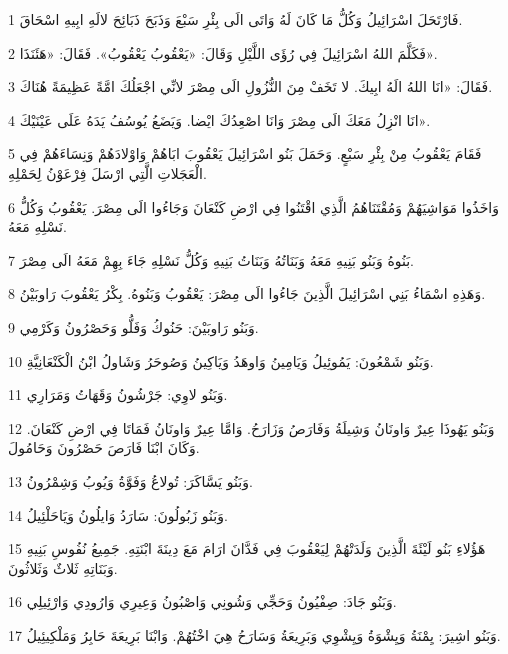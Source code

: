 \par 1 فَارْتَحَلَ اسْرَائِيلُ وَكُلُّ مَا كَانَ لَهُ وَاتَى الَى بِئْرِ سَبْعَ وَذَبَحَ ذَبَائِحَ لالَهِ ابِيهِ اسْحَاقَ.
\par 2 فَكَلَّمَ اللهُ اسْرَائِيلَ فِي رُؤَى اللَّيْلِ وَقَالَ: «يَعْقُوبُ يَعْقُوبُ». فَقَالَ: «هَئَنَذَا».
\par 3 فَقَالَ: «انَا اللهُ الَهُ ابِيكَ. لا تَخَفْ مِنَ النُّزُولِ الَى مِصْرَ لانِّي اجْعَلُكَ امَّةً عَظِيمَةً هُنَاكَ.
\par 4 انَا انْزِلُ مَعَكَ الَى مِصْرَ وَانَا اصْعِدُكَ ايْضا. وَيَضَعُ يُوسُفُ يَدَهُ عَلَى عَيْنَيْكَ».
\par 5 فَقَامَ يَعْقُوبُ مِنْ بِئْرِ سَبْعٍ. وَحَمَلَ بَنُو اسْرَائِيلَ يَعْقُوبَ ابَاهُمْ وَاوْلادَهُمْ وَنِسَاءَهُمْ فِي الْعَجَلاتِ الَّتِي ارْسَلَ فِرْعَوْنُ لِحَمْلِهِ.
\par 6 وَاخَذُوا مَوَاشِيَهُمْ وَمُقْتَنَاهُمُ الَّذِي اقْتَنُوا فِي ارْضِ كَنْعَانَ وَجَاءُوا الَى مِصْرَ. يَعْقُوبُ وَكُلُّ نَسْلِهِ مَعَهُ.
\par 7 بَنُوهُ وَبَنُو بَنِيهِ مَعَهُ وَبَنَاتُهُ وَبَنَاتُ بَنِيهِ وَكُلُّ نَسْلِهِ جَاءَ بِهِمْ مَعَهُ الَى مِصْرَ.
\par 8 وَهَذِهِ اسْمَاءُ بَنِي اسْرَائِيلَ الَّذِينَ جَاءُوا الَى مِصْرَ: يَعْقُوبُ وَبَنُوهُ. بِكْرُ يَعْقُوبَ رَاوبَيْنُ.
\par 9 وَبَنُو رَاوبَيْنَ: حَنُوكُ وَفَلُّو وَحَصْرُونُ وَكَرْمِي.
\par 10 وَبَنُو شَمْعُونَ: يَمُوئِيلُ وَيَامِينُ وَاوهَدُ وَيَاكِينُ وَصُوحَرُ وَشَاولُ ابْنُ الْكَنْعَانِيَّةِ.
\par 11 وَبَنُو لاوِي: جَرْشُونُ وَقَهَاتُ وَمَرَارِي.
\par 12 وَبَنُو يَهُوذَا عِيرٌ وَاونَانُ وَشِيلَةُ وَفَارَصُ وَزَارَحُ. وَامَّا عِيرٌ وَاونَانُ فَمَاتَا فِي ارْضِ كَنْعَانَ. وَكَانَ ابْنَا فَارَصَ حَصْرُونَ وَحَامُولَ.
\par 13 وَبَنُو يَسَّاكَرَ: تُولاعُ وَفَوَّةُ وَيُوبُ وَشِمْرُونُ.
\par 14 وَبَنُو زَبُولُونَ: سَارَدُ وَايلُونُ وَيَاحَلْئِيلُ.
\par 15 هَؤُلاءِ بَنُو لَيْئَةَ الَّذِينَ وَلَدَتْهُمْ لِيَعْقُوبَ فِي فَدَّانَ ارَامَ مَعَ دِينَةَ ابْنَتِهِ. جَمِيعُ نُفُوسِ بَنِيهِ وَبَنَاتِهِ ثَلاثٌ وَثَلاثُونَ.
\par 16 وَبَنُو جَادَ: صِفْيُونُ وَحَجِّي وَشُونِي وَاصْبُونُ وَعِيرِي وَارُودِي وَارْئِيلِي.
\par 17 وَبَنُو اشِيرَ: يِمْنَةُ وَيِشْوَةُ وَيِشْوِي وَبَرِيعَةُ وَسَارَحُ هِيَ اخْتُهُمْ. وَابْنَا بَرِيعَةَ حَابِرُ وَمَلْكِيئِيلُ.
